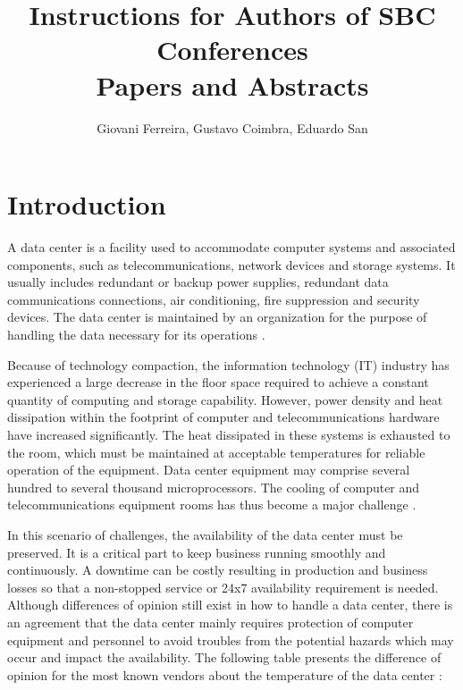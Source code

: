 \documentclass[12pt]{article}
\title{Instructions for Authors of SBC Conferences\\ Papers and Abstracts}
\author{Giovani Ferreira\inst{1}, Gustavo Coimbra\inst{1}, Eduardo San\inst{1} }
\begin{document}
 

\maketitle

\begin{abstract}
\end{abstract}
     
\begin{resumo} 
\end{resumo}

\section{Introduction}

A data center is a facility used to accommodate computer systems and associated components, such as telecommunications, 
network devices and storage systems. It usually includes redundant or backup  power supplies, redundant data communications 
connections, air conditioning, fire suppression and security devices. The data center is maintained by an organization for 
the purpose of handling the data necessary for its operations \cite{janpitak2011data} \cite{hassan2013temperature}.

Because of technology compaction, the information technology (IT) industry has experienced a large decrease
in the floor space required to achieve a constant quantity of computing and storage capability. However, 
power density and heat dissipation within the footprint of computer and telecommunications hardware have 
increased significantly. The heat dissipated in these systems is exhausted to the room, which must be
maintained at acceptable temperatures for reliable operation of the equipment. Data center equipment may 
comprise several hundred to several thousand microprocessors. The cooling of computer and telecommunications 
equipment rooms has thus become a major challenge \cite{schmidt2005challenges}.

In this scenario of challenges, the availability of the data center must be preserved. It is a critical part to keep business 
running smoothly and continuously. A downtime can be costly resulting in production and business losses so that a non-stopped 
service or 24x7 availability requirement is needed. Although differences of opinion still exist in how to handle a data center, 
there is an agreement that the data center mainly requires protection of computer equipment and personnel to avoid troubles
from the potential hazards which may occur and impact the availability. The following table presents the difference
of opinion for the most known vendors about the temperature of the data center \cite{ashrae9} \cite{moss2011data} 
\cite{packard2013applying} \cite{moss2009data}:
\end{document}
